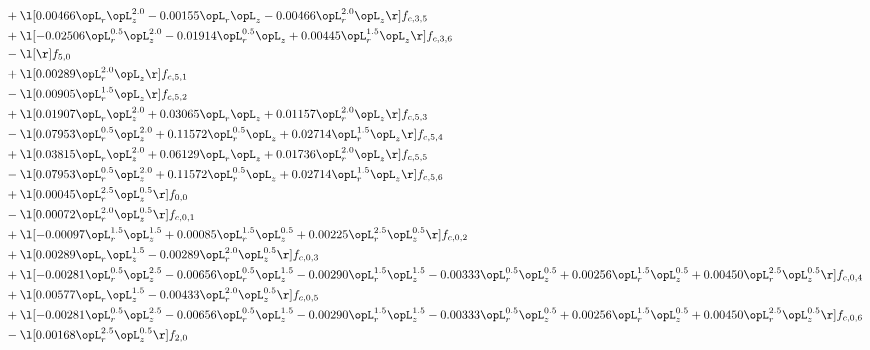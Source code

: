 \begin{alignat}{2}
& + \l[  0.00466 \opL_r \opL_z^{2.0}   -0.00155 \opL_r \opL_z   -0.00466 \opL_r^{2.0} \opL_z  \r] f_{c,3,5} \nonumber \\ 
& + \l[  -0.02506 \opL_r^{0.5} \opL_z^{2.0}   -0.01914 \opL_r^{0.5} \opL_z +  0.00445 \opL_r^{1.5} \opL_z  \r] f_{c,3,6} \nonumber \\ 
& - \l[  \r] f_{5,0} \nonumber \\ 
& + \l[  0.00289 \opL_r^{2.0} \opL_z  \r] f_{c,5,1} \nonumber \\ 
& - \l[  0.00905 \opL_r^{1.5} \opL_z  \r] f_{c,5,2} \nonumber \\ 
& + \l[  0.01907 \opL_r \opL_z^{2.0} +  0.03065 \opL_r \opL_z +  0.01157 \opL_r^{2.0} \opL_z  \r] f_{c,5,3} \nonumber \\ 
& - \l[  0.07953 \opL_r^{0.5} \opL_z^{2.0} +  0.11572 \opL_r^{0.5} \opL_z +  0.02714 \opL_r^{1.5} \opL_z  \r] f_{c,5,4} \nonumber \\ 
& + \l[  0.03815 \opL_r \opL_z^{2.0} +  0.06129 \opL_r \opL_z +  0.01736 \opL_r^{2.0} \opL_z  \r] f_{c,5,5} \nonumber \\ 
& - \l[  0.07953 \opL_r^{0.5} \opL_z^{2.0} +  0.11572 \opL_r^{0.5} \opL_z +  0.02714 \opL_r^{1.5} \opL_z  \r] f_{c,5,6} \nonumber \\ 
& + \l[  0.00045 \opL_r^{2.5} \opL_z^{0.5}  \r] f_{0,0} \nonumber \\ 
& - \l[  0.00072 \opL_r^{2.0} \opL_z^{0.5}  \r] f_{c,0,1} \nonumber \\ 
& + \l[  -0.00097 \opL_r^{1.5} \opL_z^{1.5} +  0.00085 \opL_r^{1.5} \opL_z^{0.5} +  0.00225 \opL_r^{2.5} \opL_z^{0.5}  \r] f_{c,0,2} \nonumber \\ 
& + \l[  0.00289 \opL_r \opL_z^{1.5}   -0.00289 \opL_r^{2.0} \opL_z^{0.5}  \r] f_{c,0,3} \nonumber \\ 
& + \l[  -0.00281 \opL_r^{0.5} \opL_z^{2.5}   -0.00656 \opL_r^{0.5} \opL_z^{1.5}   -0.00290 \opL_r^{1.5} \opL_z^{1.5}   -0.00333 \opL_r^{0.5} \opL_z^{0.5} +  0.00256 \opL_r^{1.5} \opL_z^{0.5} +  0.00450 \opL_r^{2.5} \opL_z^{0.5}  \r] f_{c,0,4} \nonumber \\ 
& + \l[  0.00577 \opL_r \opL_z^{1.5}   -0.00433 \opL_r^{2.0} \opL_z^{0.5}  \r] f_{c,0,5} \nonumber \\ 
& + \l[  -0.00281 \opL_r^{0.5} \opL_z^{2.5}   -0.00656 \opL_r^{0.5} \opL_z^{1.5}   -0.00290 \opL_r^{1.5} \opL_z^{1.5}   -0.00333 \opL_r^{0.5} \opL_z^{0.5} +  0.00256 \opL_r^{1.5} \opL_z^{0.5} +  0.00450 \opL_r^{2.5} \opL_z^{0.5}  \r] f_{c,0,6} \nonumber \\ 
& - \l[  0.00168 \opL_r^{2.5} \opL_z^{0.5}  \r] f_{2,0} \nonumber \\ 

\end{alignat}
